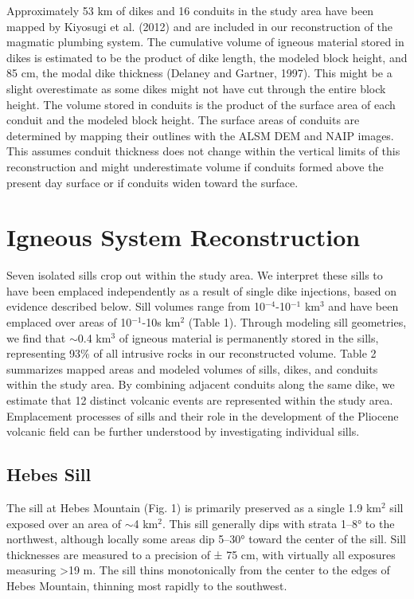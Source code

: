 \documentclass[12pt,letter]{article}
\begin{document}
Approximately 53 km of dikes and 16 conduits in the study area have been mapped by Kiyosugi et al. (2012) and are included in our reconstruction of the magmatic plumbing system. The cumulative volume of igneous material stored in dikes is estimated to be the product of dike length, the modeled block height, and 85 cm, the modal dike thickness (Delaney and Gartner, 1997). This might be a slight overestimate as some dikes might not have cut through the entire block height. The volume stored in conduits is the product of the surface area of each conduit and the modeled block height. The surface areas of conduits are determined by mapping their outlines with the ALSM DEM and NAIP images. This assumes conduit thickness does not change within the vertical limits of this reconstruction and might underestimate volume if conduits formed above the present day surface or if conduits widen toward the surface.

\section{Igneous System Reconstruction}

Seven isolated sills crop out within the study area. We interpret these sills to have been emplaced independently as a result of single dike injections, based on evidence described below. Sill volumes range from 10$^{-4}$-10$^{-1}$ km$^3$ and have been emplaced over areas of 10$^{-1}$-10s km$^2$ (Table 1). Through modeling sill geometries, we find that $\sim$0.4 km$^3$ of igneous material is permanently stored in the sills, representing 93\% of all intrusive rocks in our reconstructed volume. Table 2 summarizes mapped areas and modeled volumes of sills, dikes, and conduits within the study area. By combining adjacent conduits along the same dike, we estimate that 12 distinct volcanic events are represented within the study area. Emplacement processes of sills and their role in the development of the Pliocene volcanic field can be further understood by investigating individual sills.

\subsection{Hebes Sill}

The sill at Hebes Mountain (Fig. 1) is primarily preserved as a single 1.9 km$^2$ sill exposed over an area of $\sim$4 km$^2$. This sill generally dips with strata 1–8° to the northwest, although locally some areas dip 5–30° toward the center of the sill. Sill thicknesses are measured to a precision of ± 75 cm, with virtually all exposures measuring >19 m. The sill thins monotonically from the center to the edges of Hebes Mountain, thinning most rapidly to the southwest.
\end{document}
